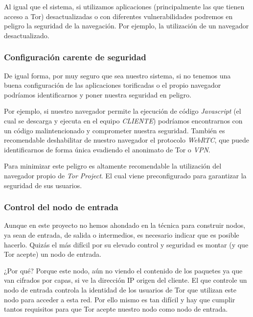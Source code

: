 \documentclass[a4paper, 11pt, titlepage]{article}
\begin{document}
        Al igual que el sistema, si utilizamos aplicaciones (principalmente las que tienen acceso a Tor) desactualizadas 
        o con diferentes vulnerabilidades podremos en peligro la seguridad de la navegación. Por ejemplo, la utilización 
        de un navegador desactualizado.

    \subsubsection{Configuración carente de seguridad}

        De igual forma, por muy seguro que sea nuestro sistema, si no tenemos una buena configuración de las aplicaciones 
        torificadas o el propio navegador podríamos identificarnos y poner nuestra seguridad en peligro.

        Por ejemplo, si nuestro navegador permite la ejecución de código \emph{Javascript} (el cual se descarga y ejecuta 
        en el equipo \emph{CLIENTE}) podríamos encontrarnos con un código malintencionado y comprometer nuestra seguridad.
        También es recomendable deshabilitar de nuestro navegador el protocolo \emph{WebRTC}, que puede identificarnos de 
        forma única evadiendo el anonimato de Tor o \emph{VPN}.

        Para minimizar este peligro es altamente recomendable la utilización del navegador propio de \emph{Tor Project}. 
        El cual viene preconfigurado para garantizar la seguridad de sus usuarios.

    \subsubsection{Control del nodo de entrada}
        
        Aunque en este proyecto no hemos ahondado en la técnica para construir nodos, ya sean de entrada, de salida o 
        intermedios, es necesario indicar que es posible hacerlo. Quizás el más difícil por su elevado control y seguridad 
        es montar (y que Tor acepte) un nodo de entrada.
        
        ¿Por qué? Porque este nodo, aún no viendo el contenido de los paquetes ya que van cifrados por capas, si ve la 
        dirección IP origen del cliente. El que controle un nodo de entrada controla la identidad de los usuarios de Tor 
        que utilizan este nodo para acceder a esta red. Por ello mismo es tan difícil y hay que cumplir tantos requisitos 
        para que Tor acepte nuestro nodo como nodo de entrada.
        
\end{document}
